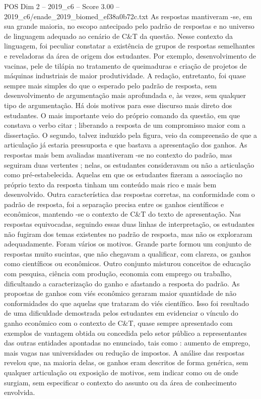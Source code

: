 \begin{textsample}{POS Dim 2 – 2019\_c6 – Score 3.00 – 2019\_c6/enade\_2019\_biomed\_ef38a0b72c.txt}
As respostas mantiveram -se, em sua grande maioria, no escopo antecipado pelo padrão de respostas e no universo de linguagem adequado ao cenário de C\&T da questão.
Nesse contexto da linguagem, foi peculiar constatar a existência de grupos de respostas semelhantes e reveladoras da área de origem dos estudantes.
Por exemplo, desenvolvimento de vacinas, pele de tilápia no tratamento de queimaduras e criação de projetos de máquinas industriais de maior produtividade.
A redação, entretanto, foi quase sempre mais simples do que o esperado pelo padrão de resposta, sem desenvolvimento de argumentação mais aprofundada e, às vezes, sem qualquer tipo de argumentação.
Há dois motivos para esse discurso mais direto dos estudantes.
O mais importante veio do próprio comando da questão, em que constava o verbo citar ; liberando a resposta de um compromisso maior com a dissertação.
O segundo, talvez induzido pela figura, veio da compreensão de que a articulação já estaria pressuposta e que bastava a apresentação dos ganhos.
As respostas mais bem avaliadas mantiveram -se no contexto do padrão, mas seguiram duas vertentes ; nelas, os estudantes consideravam ou não a articulação como pré-estabelecida.
Aquelas em que os estudantes fizeram a associação no próprio texto da resposta tinham um conteúdo mais rico e mais bem desenvolvido.
Outra característica das respostas corretas, na conformidade com o padrão de resposta, foi a separação precisa entre os ganhos científicos e econômicos, mantendo -se o contexto de C\&T do texto de apresentação.
Nas respostas equivocadas, seguindo essas duas linhas de interpretação, os estudantes não fugiram dos temas existentes no padrão de resposta, mas não os exploraram adequadamente.
Foram vários os motivos.
Grande parte formou um conjunto de respostas muito sucintas, que não chegavam a qualificar, com clareza, os ganhos como científicos ou econômicos.
Outro conjunto misturou conceitos de educação com pesquisa, ciência com produção, economia com emprego ou trabalho, dificultando a caracterização do ganho e afastando a resposta do padrão.
As propostas de ganhos com viés econômico geraram maior quantidade de não conformidades do que aquelas que trataram do viés científico.
Isso foi resultado de uma dificuldade demostrada pelos estudantes em evidenciar o vínculo do ganho econômico com o contexto de C\&T, quase sempre apresentado com exemplos de vantagem obtida ou concedida pelo setor público a representantes das outras entidades apontadas no enunciado, tais como : aumento de emprego, mais vagas nas universidades ou redução de impostos.
A análise das respostas revelou que, na maioria delas, os ganhos eram descritos de forma genérica, sem qualquer articulação ou exposição de motivos, sem indicar como ou de onde surgiam, sem especificar o contexto do assunto ou da área de conhecimento envolvida.

\end{textsample}
